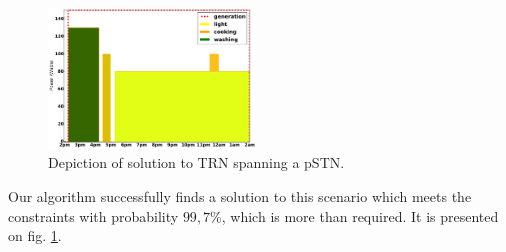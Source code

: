 \begin{figure}[H]
\begin{center}
\includegraphics[width=0.49\textwidth]{pstnu_scheduling}
\caption{Depiction of solution to TRN spanning a pSTN.}
\label{fig:pstnu_scheduling}
\end{center}
\end{figure}

Our algorithm successfully finds a solution to this scenario which meets the constraints with probability $99,7\%$, which is more than required. It is presented on fig. \ref{fig:pstnu_scheduling}.
